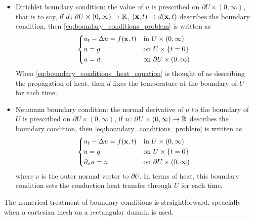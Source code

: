 \begin{itemize}
	\item Dirichlet boundary condition: the value of $u$ is prescribed on $\partial U \times (0,\infty)$, that is to say, if $d \colon \partial U \times (0,\infty) \rightarrow \mathbb{R}$, $(\vb{x}, t) \mapsto d(\vb{x}, t)$ describes the boundary condition, then \eqref{eq:boundary_conditions_problem} is written as
	\begin{equation}
		\left\{
		\begin{aligned}
			&u_t - \Delta u = f(\vb{x}, t) & &\text{in } U \times (0,\infty) \\
			&u = g & &\text{on } U \times \{ t = 0 \} \\
			&u = d & &\text{on } \partial U \times (0,\infty)
		\end{aligned}
		\right.
	\end{equation}
	When \eqref{eq:boundary_conditions_heat_equation} is thought of as describing the propagation of heat, then $d$ fixes the temperature at the boundary of $U$ for each time.
	\item Neumann boundary condition: the normal derivative of $u$ to the boundary of $U$ is prescribed on $\partial U \times (0,\infty)$, \ie if $n \colon \partial U \times (0,\infty) \rightarrow \mathbb{R}$ describes the boundary condition, then \eqref{eq:boundary_conditions_problem} is written as
	\begin{equation}
		\left\{
		\begin{aligned}
			&u_t - \Delta u = f(\vb{x}, t) 	& &\text{in } U \times (0,\infty) \\
			&u = g 							& &\text{on } U \times \{ t = 0 \} \\
			&\partial_{\nu} u = n 			& &\text{on } \partial U \times (0,\infty)
		\end{aligned}
		\right.
	\end{equation}
	where $\nu$ is the outer normal vector to $\partial U$. In terms of heat, this boundary condition sets the conduction heat transfer through $U$ for each time.
\end{itemize}

The numerical treatment of boundary conditions is straightforward, speacially when a cartesian mesh on a rectangular domain is used.

